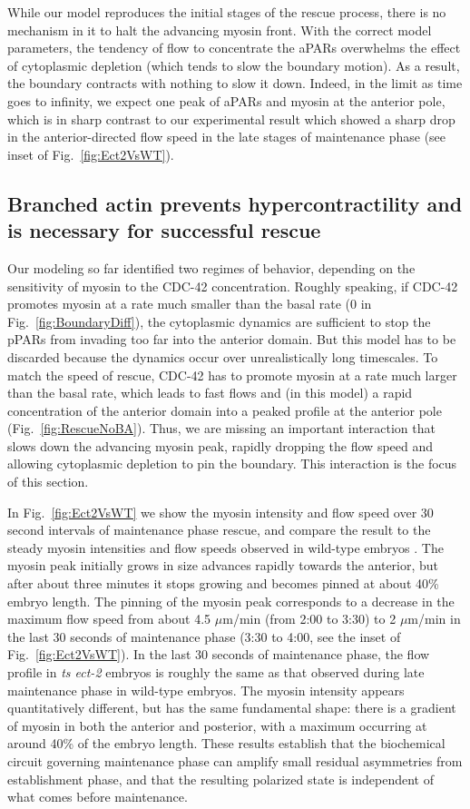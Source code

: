 \documentclass[11pt]{article}
\newcommand{\6}[1]{#1_{\text{6}}}
\newcommand{\3}[1]{#1_{\text{3}}}
\begin{document}
While our model reproduces the initial stages of the rescue process, there is no mechanism in it to halt the advancing myosin front. With the correct model parameters, the tendency of flow to concentrate the aPARs overwhelms the effect of cytoplasmic depletion (which tends to slow the boundary motion). As a result, the boundary contracts with nothing to slow it down. Indeed, in the limit as time goes to infinity, we expect one peak of aPARs and myosin at the anterior pole, which is in sharp contrast to our experimental result which showed a sharp drop in the anterior-directed flow speed in the late stages of maintenance phase (see inset of Fig.\ \ref{fig:Ect2VsWT}).

\subsection*{Branched actin prevents hypercontractility and is necessary for successful rescue}


Our modeling so far identified two regimes of behavior, depending on the sensitivity of myosin to the CDC-42 concentration. Roughly speaking, if CDC-42 promotes myosin at a rate much smaller than the basal rate (0 in Fig.\ \ref{fig:BoundaryDiff}), the cytoplasmic dynamics are sufficient to stop the pPARs from invading too far into the anterior domain. But this model has to be discarded because the dynamics occur over unrealistically long timescales. To match the speed of rescue, CDC-42 has to promote myosin at a rate much larger than the basal rate, which leads to fast flows and (in this model) a rapid concentration of the anterior domain into a peaked profile at the anterior pole (Fig.\ \ref{fig:RescueNoBA}). Thus, we are missing an important interaction that slows down the advancing myosin peak, rapidly dropping the flow speed and allowing cytoplasmic depletion to pin the boundary. This interaction is the focus of this section.

In Fig.\ \ref{fig:Ect2VsWT} we show the myosin intensity and flow speed over 30 second intervals of maintenance phase rescue, and compare the result to the steady myosin intensities and flow speeds observed in wild-type embryos \citep{sailer2015dynamic}. The myosin peak initially grows in size advances rapidly towards the anterior, but after about three minutes it stops growing and becomes pinned at about 40\% embryo length. The pinning of the myosin peak corresponds to a decrease in the maximum flow speed from about 4.5 $\mu$m/min (from 2:00 to 3:30) to 2 $\mu$m/min in the last 30 seconds of maintenance phase (3:30 to 4:00, see the inset of Fig.\ \ref{fig:Ect2VsWT}). In the last 30 seconds of maintenance phase, the flow profile in \emph{ts ect-2} embryos is roughly the same as that observed during late maintenance phase in wild-type embryos. The myosin intensity appears quantitatively different, but has the same fundamental shape: there is a gradient of myosin in both the anterior and posterior, with a maximum occurring at around 40\% of the embryo length. These results establish that the biochemical circuit governing maintenance phase can amplify small residual asymmetries from establishment phase, and that the resulting polarized state is independent of what comes before maintenance. 
\end{document}
